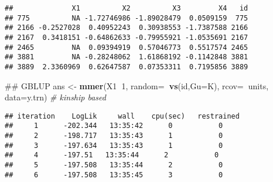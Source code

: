 \documentclass[]{article}
\newenvironment{Shaded}{\begin{snugshade}}{\end{snugshade}}
\newcommand{\KeywordTok}[1]{\textcolor[rgb]{0.13,0.29,0.53}{\textbf{#1}}}
\newcommand{\DataTypeTok}[1]{\textcolor[rgb]{0.13,0.29,0.53}{#1}}
\newcommand{\DecValTok}[1]{\textcolor[rgb]{0.00,0.00,0.81}{#1}}
\newcommand{\StringTok}[1]{\textcolor[rgb]{0.31,0.60,0.02}{#1}}
\newcommand{\CommentTok}[1]{\textcolor[rgb]{0.56,0.35,0.01}{\textit{#1}}}
\newcommand{\OperatorTok}[1]{\textcolor[rgb]{0.81,0.36,0.00}{\textbf{#1}}}
\newcommand{\NormalTok}[1]{#1}
\begin{document}
\begin{verbatim}
##              X1          X2          X3         X4   id
## 775          NA -1.72746986 -1.89028479  0.0509159  775
## 2166 -0.2527028  0.40952243  0.30938553 -1.7387588 2166
## 2167  0.3418151 -0.64862633 -0.79955921 -1.0535691 2167
## 2465         NA  0.09394919  0.57046773  0.5517574 2465
## 3881         NA -0.28248062  1.61868192 -0.1142848 3881
## 3889  2.3360969  0.62647587  0.07353311  0.7195856 3889
\end{verbatim}

\begin{Shaded}
\begin{Highlighting}[]
\NormalTok{## GBLUP}
\NormalTok{ans <-}\StringTok{ }\KeywordTok{mmer}\NormalTok{(X1}\OperatorTok{~}\DecValTok{1}\NormalTok{,}
            \DataTypeTok{random=}\OperatorTok{~}\KeywordTok{vs}\NormalTok{(id,}\DataTypeTok{Gu=}\NormalTok{K), }
            \DataTypeTok{rcov=}\OperatorTok{~}\NormalTok{units, }
            \DataTypeTok{data=}\NormalTok{y.trn) }\CommentTok{# kinship based}
\end{Highlighting}
\end{Shaded}

\begin{verbatim}
## iteration    LogLik     wall    cpu(sec)   restrained
##     1      -202.344   13:35:42      0           0
##     2      -198.717   13:35:43      1           0
##     3      -197.634   13:35:43      1           0
##     4      -197.51   13:35:44      2           0
##     5      -197.508   13:35:44      2           0
##     6      -197.508   13:35:45      3           0
\end{verbatim}

\begin{Shaded}
\end{Shaded}
\end{document}
